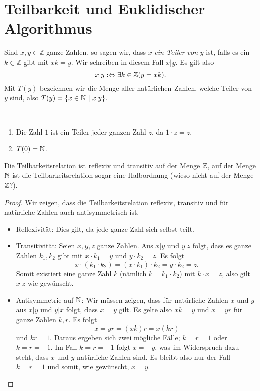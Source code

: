 \section{Teilbarkeit und Euklidischer Algorithmus}
\begin{df}
 Sind $x,y\in\mathbb{Z}$ ganze Zahlen, so sagen wir, dass $x$ \textit{ein Teiler von} $y$ ist, falls es ein $k\in\mathbb{Z}$ gibt mit $xk=y$. Wir schreiben in diesem Fall $x|y$. Es gilt also
\[
 x|y:\Leftrightarrow \exists k\in\mathbb{Z}(y=xk).
\]
Mit $T(y)$ bezeichnen wir die Menge aller natürlichen Zahlen, welche Teiler von $y$ sind, also $T(y)=\{x\in\mathbb{N}\mid x|y\}$.
\end{df}
\begin{bsp}~
 \begin{enumerate}
  \item Die Zahl $1$ ist ein Teiler jeder ganzen Zahl $z$, da $1\cdot z=z$.
\item $T(0)=\mathbb{N}$.
 \end{enumerate}

\end{bsp}
\begin{rk}
 Die Teilbarkeitsrelation ist reflexiv und transitiv auf der Menge $\mathbb{Z}$, auf der Menge $\mathbb{N}$ ist die Teilbarkeitsrelation sogar eine Halbordnung (wieso nicht auf der Menge $\mathbb{Z}$?).
\end{rk}
\begin{proof}
Wir zeigen, dass die Teilbarkeitsrelation reflexiv, transitiv und für natürliche Zahlen auch antisymmetrisch ist.
\begin{itemize}
\item Reflexivität: Dies gilt, da jede ganze Zahl sich selbst teilt.
\item Transitivität: Seien $x,y,z$ ganze Zahlen. Aus $x|y$ und $y|z$ folgt, dass es ganze Zahlen $k_1,k_2$ gibt mit $x\cdot k_1=y$ und $y\cdot k_2=z$. Es folgt
\[
x\cdot(k_1\cdot k_2)=(x\cdot k_1)\cdot k_2=y\cdot k_2=z.
\]
 Somit existiert eine ganze Zahl $k$ (nämlich $k=k_1\cdot k_2$) mit $k\cdot x=z$, also gilt $x|z$ wie gewünscht.\qedhere
\item Antisymmetrie auf $\mathbb{N}$: Wir müssen zeigen, dass für natürliche Zahlen $x$ und $y$ aus $x|y$ und $y|x$ folgt, dass $x=y$ gilt. Es gelte also $xk=y$ und $x=yr$ für ganze Zahlen $k,r$. Es folgt
\[
x=yr=(xk)r=x(kr)
\]
und $kr=1$. Daraus ergeben sich zwei mögliche Fälle; $k=r=1$ oder $k=r=-1$. Im Fall $k=r=-1$ folgt $x=-y$, was im Widerspruch dazu steht, dass $x$ und $y$ natürliche Zahlen sind. Es bleibt also nur der Fall $k=r=1$ und somit, wie gewünscht, $x=y$.
\end{itemize}
\end{proof}

